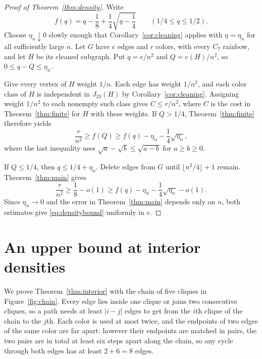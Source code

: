 \documentclass[10pt]{article}
\theoremstyle{remark}
\begin{document}
\begin{proof}[Proof of Theorem~\ref{thm:density}]
Write
\[
 f(q)=q-\frac18+\frac14\sqrt{q-\frac14}
       \qquad(1/4\le q\le1/2).
\]
Choose $\eta_n\downarrow0$ slowly enough that Corollary~\ref{cor:cleaning} applies with $\eta=\eta_n$ for all sufficiently large $n$. Let $G$ have $e$ edges and $r$ colors, with every $C_7$ rainbow, and let $H$ be its cleaned subgraph. Put $q=e/n^2$ and $Q=e(H)/n^2$, so $0\le q-Q\le\eta_n$.

Give every vertex of $H$ weight $1/n$. Each edge has weight $1/n^2$, and each color class of $H$ is independent in $J_{23}(H)$ by Corollary~\ref{cor:cleaning}. Assigning weight $1/n^2$ to each nonempty such class gives $C\le r/n^2$, where $C$ is the cost in Theorem~\ref{thm:finite} for $H$ with these weights. If $Q>1/4$, Theorem~\ref{thm:finite} therefore yields
\[
 \frac r{n^2}\ge f(Q)
       \ge f(q)-\eta_n-\frac14\sqrt{\eta_n},
\]
where the last inequality uses $\sqrt a-\sqrt b\le\sqrt{a-b}$ for $a\ge b\ge0$.

If $Q\le1/4$, then $q\le1/4+\eta_n$. Delete edges from $G$ until $\lfloor n^2/4\rfloor+1$ remain. Theorem~\ref{thm:main} gives
\[
 \frac r{n^2}\ge\frac18-o(1)
       \ge f(q)-\eta_n-\frac14\sqrt{\eta_n}-o(1).
\]
Since $\eta_n\to0$ and the error in Theorem~\ref{thm:main} depends only on $n$, both estimates give \eqref{eq:densitybound} uniformly in $e$.
\end{proof}

\section{An upper bound at interior densities}\label{sec:interior}

We prove Theorem~\ref{thm:interior} with the chain of five cliques in Figure~\ref{fig:chain}. Every edge lies inside one clique or joins two consecutive cliques, so a path needs at least $|i-j|$ edges to get from the $i$th clique of the chain to the $j$th. Each color is used at most twice, and the endpoints of two edges of the same color are far apart: however their endpoints are matched in pairs, the two pairs are in total at least six steps apart along the chain, so any cycle through both edges has at least $2+6=8$ edges.
\end{document}
